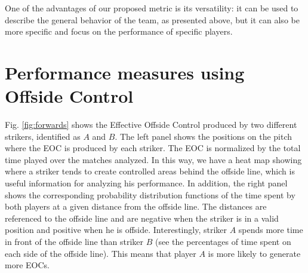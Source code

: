 \documentclass[
  10pt,
  twoside,nohyper]{book}
\begin{document}
One of the advantages of our proposed metric is its versatility: it can be used to describe the general behavior of the team, as presented above, but it can also be more specific and focus on the performance of specific players.

\section{Performance measures using Offside Control}\label{performance-measures-using-offside-control}

Fig. \ref{fig:forwards} shows the Effective Offside Control produced by two different strikers, identified as \(A\) and \(B\). The left panel shows the positions on the pitch where the EOC is produced by each striker. The EOC is normalized by the total time played over the matches analyzed. In this way, we have a heat map showing where a striker tends to create controlled areas behind the offside line, which is useful information for analyzing his performance. In addition, the right panel shows the corresponding probability distribution functions of the time spent by both players at a given distance from the offside line. The distances are referenced to the offside line and are negative when the striker is in a valid position and positive when he is offside. Interestingly, striker \(A\) spends more time in front of the offside line than striker \(B\) (see the percentages of time spent on each side of the offside line). This means that player \(A\) is more likely to generate more EOCs.
\end{document}
